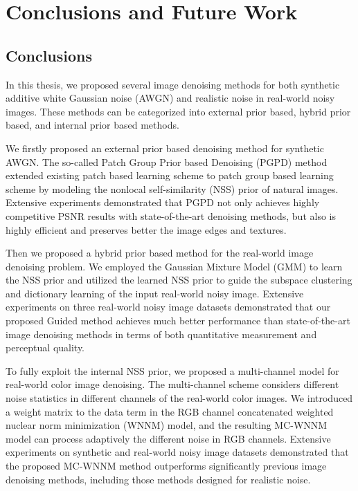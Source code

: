 %
\chapter{Conclusions and Future Work}
\label{sec:conclusions}


\section{Conclusions}
\label{sec:conclusions:sec1}
In this thesis, we proposed several image denoising methods for both synthetic additive white Gaussian noise (AWGN) and realistic noise in real-world noisy images. These methods can be categorized into external prior based, hybrid prior based, and internal prior based methods.

We firstly proposed an external prior based denoising method for synthetic AWGN. The so-called Patch Group Prior based Denoising (PGPD) method extended existing patch based learning scheme \cite{epll} to patch group based learning scheme by modeling the nonlocal self-similarity (NSS) prior of natural images. Extensive experiments demonstrated that PGPD not only achieves highly competitive PSNR results with state-of-the-art denoising methods, but also is highly efficient and preserves better the image edges and textures.

Then we proposed a hybrid prior based method for the real-world image denoising problem. We employed the Gaussian Mixture Model (GMM) to learn the NSS prior and utilized the learned NSS prior to guide the subspace clustering and dictionary learning of the input real-world noisy image. Extensive experiments on three real-world noisy image datasets demonstrated that our proposed Guided method achieves much better performance than state-of-the-art image denoising methods in terms of both quantitative measurement and perceptual quality.

To fully exploit the internal NSS prior, we proposed a multi-channel model for real-world color image denoising. The multi-channel scheme considers different noise statistics in different channels of the real-world color images. We introduced a weight matrix to the data term in the RGB channel concatenated weighted nuclear norm minimization (WNNM) model, and the resulting MC-WNNM model can process adaptively the different noise in RGB channels. Extensive experiments on synthetic and real-world noisy image datasets demonstrated that the proposed MC-WNNM method outperforms significantly previous image denoising methods, including those methods designed for realistic noise.

